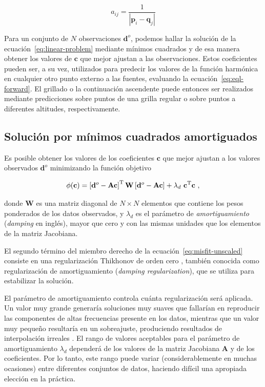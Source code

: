 \begin{equation}
    a_{ij} = \frac{1}{|\mathbf{p}_i - \mathbf{q}_j|}
\end{equation}

Para un conjunto de $N$ observaciones $\mathbf{d}^o$, podemos hallar la
solución de la ecuación~\ref{eq:linear-problem} mediante mínimos cuadrados y de
esa manera obtener los valores de
$\mathbf{c}$ que mejor ajustan a las observaciones.
Estos coeficientes pueden ser, a su vez, utilizados para predecir los valores
de la función harmónica en cualquier otro punto externo a las fuentes,
evaluando la ecuación~\ref{eq:eql-forward}.
El grillado o la continuación ascendente puede entonces ser realizados mediante
predicciones sobre puntos de una grilla regular o sobre puntos a diferentes
altitudes, respectivamente.


\subsection{Solución por mínimos cuadrados amortiguados}
\label{sec:eql_inversion}

Es posible obtener los valores de los coeficientes $\mathbf{c}$ que mejor
ajustan a los valores observados $\mathbf{d}^o$ minimizando la función objetivo

\begin{equation}
    \phi(\mathbf{c}) =
    \left[\mathbf{d}^o - \mathbf{A}\mathbf{c}\right]^{\text{T}}
    \mathbf{W}
    \left[\mathbf{d}^o - \mathbf{A}\mathbf{c}\right]
    + \lambda_d\ \mathbf{c}^{\text{T}}\mathbf{c}
    \ ,
    \label{eq:misfit-unscaled}
\end{equation}

\noindent donde
$\mathbf{W}$ es una matriz diagonal de $N \times N$ elementos que contiene los
pesos ponderados de los datos observados, y
$\lambda_d$ es el parámetro de \emph{amortiguamiento} (\emph{damping} en
inglés), mayor que cero y con las mismas unidades que los elementos de la
matriz Jacobiana.

El segundo término del miembro derecho de la ecuación~\ref{eq:misfit-unscaled}
consiste en una regularización Thikhonov de orden cero \citep{tikhonov1977},
también conocida como regularización de amortiguamiento (\emph{damping
regularization}), que se utiliza para estabilizar la solución.

El parámetro de amortiguamiento controla cuánta regularización será aplicada.
Un valor muy grande generaría soluciones muy suaves que fallarían en reproducir
las componentes de altas frecuencias presente en los datos, mientras que un
valor muy pequeño resultaría en un sobreajuste, produciendo resultados de
interpolación irreales
\citep{martinez2016}.
El rango de valores aceptables para el parámetro de amortiguamiento
$\lambda_d$ dependerá de los valores de la matriz Jacobiana $\mathbf{A}$
y de los coeficientes.
Por lo tanto, este rango puede variar (considerablemente en muchas ocasiones)
entre diferentes conjuntos de datos, haciendo difícil una apropiada elección en
la práctica.

